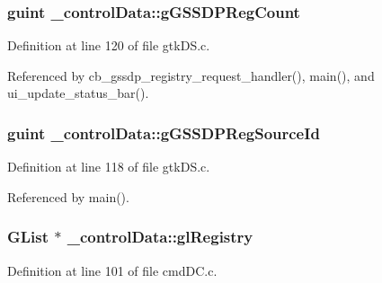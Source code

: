 \hypertarget{struct__control_data_a841eb51dde0376a7540a23e65933e822}{
\subsubsection[{g\+G\+S\+S\+D\+P\+Reg\+Count}]{\setlength{\rightskip}{0pt plus 5cm}guint \+\_\+control\+Data\+::g\+G\+S\+S\+D\+P\+Reg\+Count}}\label{struct__control_data_a841eb51dde0376a7540a23e65933e822}


Definition at line 120 of file gtk\+D\+S.\+c.



Referenced by cb\+\_\+gssdp\+\_\+registry\+\_\+request\+\_\+handler(), main(), and ui\+\_\+update\+\_\+status\+\_\+bar().

\hypertarget{struct__control_data_a4132cf34364874408e8b15be539e654d}{
\subsubsection[{g\+G\+S\+S\+D\+P\+Reg\+Source\+Id}]{\setlength{\rightskip}{0pt plus 5cm}guint \+\_\+control\+Data\+::g\+G\+S\+S\+D\+P\+Reg\+Source\+Id}}\label{struct__control_data_a4132cf34364874408e8b15be539e654d}


Definition at line 118 of file gtk\+D\+S.\+c.



Referenced by main().

\hypertarget{struct__control_data_a34b1729bc0b37c9dce0327ea4cd8a812}{
\subsubsection[{gl\+Registry}]{\setlength{\rightskip}{0pt plus 5cm}G\+List $\ast$ \+\_\+control\+Data\+::gl\+Registry}}\label{struct__control_data_a34b1729bc0b37c9dce0327ea4cd8a812}


Definition at line 101 of file cmd\+D\+C.\+c.



